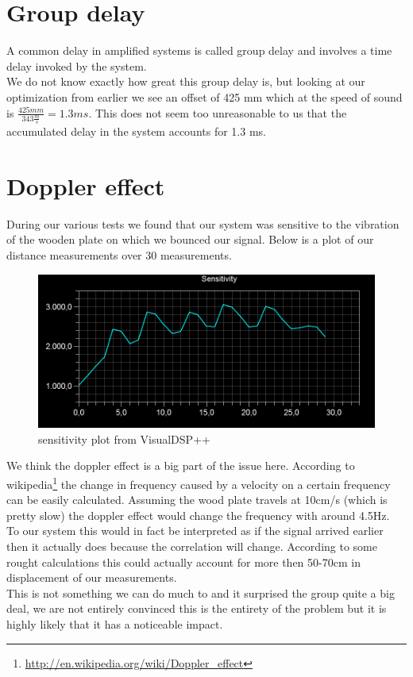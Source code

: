 \section{Group delay}
A common delay in amplified systems is called group delay and involves a time delay invoked by the system. \\
We do not know exactly how great this group delay is, but looking at our optimization from earlier we see an offset of 425 mm which at the speed of sound is  $\frac{425mm}{343\frac{m}{s}}=1.3ms$. This does not seem too unreasonable to us that the accumulated delay in the system accounts for 1.3 ms.\\
\section{Doppler effect}
During our various tests we found that our system was sensitive to the vibration of the wooden plate on which we bounced our signal. Below is a plot of our distance measurements over 30 measurements.\\
\begin{figure}[H]
\centering
\includegraphics[width=.8\textwidth]{billeder/sensitivity}
\caption{sensitivity plot from VisualDSP++}
\end{figure}
We think the doppler effect is a big part of the issue here. According to wikipedia\footnote{\url{http://en.wikipedia.org/wiki/Doppler_effect}} the change in frequency caused by a velocity on a certain frequency can be easily calculated. Assuming the wood plate travels at 10cm/s (which is pretty slow) the doppler effect would change the frequency with around 4.5Hz.\\
To our system this would in fact be interpreted as if the signal arrived earlier then it actually does because the correlation will change. According to some rought calculations this could actually account for more then 50-70cm in displacement of our measurements.\\
This is not something we can do much to and it surprised the group quite a big deal, we are not entirely convinced this is the entirety of the problem but it is highly likely that it has a noticeable impact.\\
